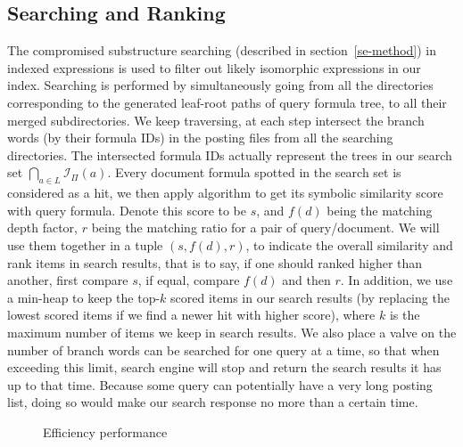 \documentclass{acm_proc_article-sp}
\begin{document}
\subsection{Searching and Ranking}
The compromised substructure searching (described in section~\ref{se-method}) in indexed expressions is used to filter out likely isomorphic expressions in our index.
Searching is performed by simultaneously going from all the directories corresponding to the generated leaf-root paths of query formula tree,
to all their merged subdirectories. 
We keep traversing, at each step intersect  the branch words (by their formula IDs) in the posting files from all the searching directories. 
The intersected formula IDs actually represent the trees in our search set $\bigcap_{a \in L} \mathcal{I}_{\Pi}(a)$.
Every document formula spotted in the search set is considered as a hit, we then apply  algorithm to get its symbolic similarity score with query formula. 
Denote this score to be $s$, and $f(d)$ being the matching depth factor, $r$ being the matching ratio for a pair of query/document. 
We will use them together in a tuple $(s, f(d), r)$, to indicate the overall similarity and rank items in search results,
that is to say, if one should ranked higher than another, first compare $s$, if equal, compare $f(d)$ and then $r$.
In addition, we use a min-heap to keep the top-$k$ scored items in our search results (by replacing the lowest scored items if we find a newer hit with higher score), where $k$ is the maximum number of items we keep in search results.
We also place a valve on the number of branch words can be searched for one query at a time,
so that when exceeding this limit, search engine will stop and return the search results it has up to that time. Because some query can potentially have a very long posting list, doing so would make our search response no more than a certain time.

\begin{figure}
\begin{center}
\end{center}
\caption{Efficiency performance}\label{effiperf}
\end{figure}
\end{document}

